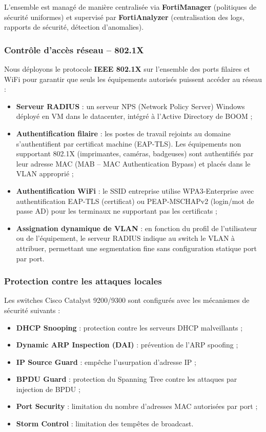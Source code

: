 \documentclass[12pt,a4paper]{report}
\begin{document}
L'ensemble est managé de manière centralisée via \textbf{FortiManager} (politiques de sécurité uniformes) et supervisé par \textbf{FortiAnalyzer} (centralisation des logs, rapports de sécurité, détection d'anomalies).

\subsubsection{Contrôle d'accès réseau -- 802.1X}

Nous déployons le protocole \textbf{IEEE 802.1X} sur l'ensemble des ports filaires et WiFi pour garantir que seuls les équipements autorisés puissent accéder au réseau :

\begin{itemize}
\item \textbf{Serveur RADIUS} : un serveur NPS (Network Policy Server) Windows déployé en VM dans le datacenter, intégré à l'Active Directory de BOOM ;
\item \textbf{Authentification filaire} : les postes de travail rejoints au domaine s'authentifient par certificat machine (EAP-TLS). Les équipements non supportant 802.1X (imprimantes, caméras, badgeuses) sont authentifiés par leur adresse MAC (MAB -- MAC Authentication Bypass) et placés dans le VLAN approprié ;
\item \textbf{Authentification WiFi} : le SSID entreprise utilise WPA3-Enterprise avec authentification EAP-TLS (certificat) ou PEAP-MSCHAPv2 (login/mot de passe AD) pour les terminaux ne supportant pas les certificats ;
\item \textbf{Assignation dynamique de VLAN} : en fonction du profil de l'utilisateur ou de l'équipement, le serveur RADIUS indique au switch le VLAN à attribuer, permettant une segmentation fine sans configuration statique port par port.
\end{itemize}

\subsubsection{Protection contre les attaques locales}

Les switches Cisco Catalyst 9200/9300 sont configurés avec les mécanismes de sécurité suivants :

\begin{itemize}
\item \textbf{DHCP Snooping} : protection contre les serveurs DHCP malveillants ;
\item \textbf{Dynamic ARP Inspection (DAI)} : prévention de l'ARP spoofing ;
\item \textbf{IP Source Guard} : empêche l'usurpation d'adresse IP ;
\item \textbf{BPDU Guard} : protection du Spanning Tree contre les attaques par injection de BPDU ;
\item \textbf{Port Security} : limitation du nombre d'adresses MAC autorisées par port ;
\item \textbf{Storm Control} : limitation des tempêtes de broadcast.
\end{itemize}
\end{document}
